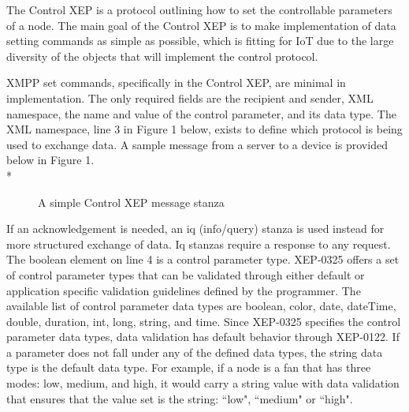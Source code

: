 The Control XEP is a protocol outlining how to set the controllable parameters 
of a node. The main goal of the Control XEP is 
to make implementation of data setting commands as simple as possible, which is 
fitting for IoT due to the large diversity of the objects that will implement 
the control protocol.

XMPP set commands, specifically in the Control XEP, are minimal in implementation. 
The only required fields are the recipient and sender, XML namespace, the name 
and value of the control parameter, and its data type. The XML namespace, line 
3 in Figure 1 below, exists to define which protocol is being used to 
exchange data. A sample message from a server to a device is provided below in 
Figure 1.\\*
\begin{figure}
\caption{A simple Control XEP message stanza}

\end{figure}

If an acknowledgement is needed, an iq (info/query) stanza is used instead for more structured exchange of data\cite{rfc6120}. Iq stanzas require a response to any request.\\
The boolean element on line 4 is a control parameter type. XEP-0325 offers a set of control parameter types that can be validated through either default or application specific validation guidelines defined by the programmer. The available list of control parameter data types are boolean, color, date, dateTime, double, duration, int, long, string, and time. Since XEP-0325 specifies the control parameter data types, data validation has default behavior through XEP-0122. If a parameter does not fall under any of the defined data types, the string data type is the default data type. For example, if a node is a fan that has three modes: low, medium, and high, it would carry a string value with data validation that ensures that the value set is the string:  ``low",  ``medium" or  ``high".\\

